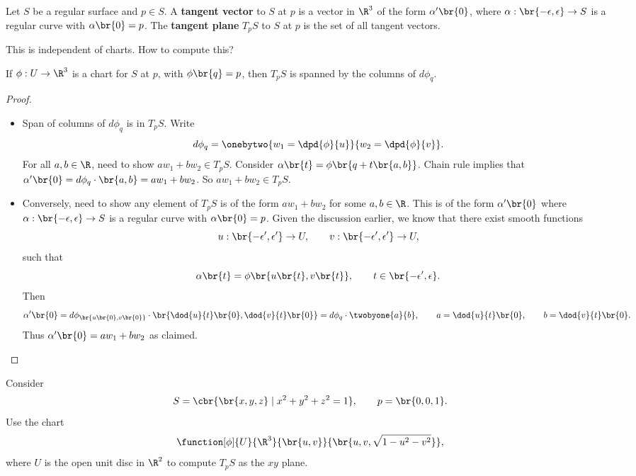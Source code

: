 \pagebreak

\begin{definition}
Let $ S $ be a regular surface and $ p \in S $. A \textbf{tangent vector} to $ S $ at $ p $ is a vector in $ \R^3 $ of the form $ \alpha'\br{0} $, where $ \alpha : \br{-\epsilon, \epsilon} \to S $ is a regular curve with $ \alpha\br{0} = p $. The \textbf{tangent plane} $ T_pS $ to $ S $ at $ p $ is the set of all tangent vectors.
\end{definition}

This is independent of charts. How to compute this?

\begin{proposition}
If $ \phi : U \to \R^3 $ is a chart for $ S $ at $ p $, with $ \phi\br{q} = p $, then $ T_pS $ is spanned by the columns of $ d\phi_q $.
\end{proposition}

\begin{proof}
\hfill
\begin{itemize}
\item Span of columns of $ d\phi_q $ is in $ T_pS $. Write
$$ d\phi_q = \onebytwo{w_1 = \dpd{\phi}{u}}{w_2 = \dpd{\phi}{v}}. $$
For all $ a, b \in \R $, need to show $ aw_1 + bw_2 \in T_pS $. Consider $ \alpha\br{t} = \phi\br{q + t\br{a, b}} $. Chain rule implies that $ \alpha'\br{0} = d\phi_q \cdot \br{a, b} = aw_1 + bw_2 $. So $ aw_1 + bw_2 \in T_pS $.
\item Conversely, need to show any element of $ T_pS $ is of the form $ aw_1 + bw_2 $ for some $ a, b \in \R $. This is of the form $ \alpha'\br{0} $ where $ \alpha : \br{-\epsilon, \epsilon} \to S $ is a regular curve with $ \alpha\br{0} = p $. Given the discussion earlier, we know that there exist smooth functions
$$ u : \br{-\epsilon', \epsilon'} \to U, \qquad v : \br{-\epsilon', \epsilon'} \to U, $$
such that
$$ \alpha\br{t} = \phi\br{u\br{t}, v\br{t}}, \qquad t \in \br{-\epsilon', \epsilon}. $$
Then
$$ \alpha'\br{0} = d\phi_{\br{u\br{0}, v\br{0}}} \cdot \br{\dod{u}{t}\br{0}, \dod{v}{t}\br{0}} = d\phi_q \cdot \twobyone{a}{b}, \qquad a = \dod{u}{t}\br{0}, \qquad b = \dod{v}{t}\br{0}. $$
Thus $ \alpha'\br{0} = aw_1 + bw_2 $ as claimed.
\end{itemize}
\end{proof}

\begin{example*}
Consider
$$ S = \cbr{\br{x, y, z} \mid x^2 + y^2 + z^2 = 1}, \qquad p = \br{0, 0, 1}. $$
Use the chart
$$ \function[\phi]{U}{\R^3}{\br{u, v}}{\br{u, v, \sqrt{1 - u^2 - v^2}}}, $$
where $ U $ is the open unit disc in $ \R^2 $ to compute $ T_pS $ as the $ xy $ plane.
\end{example*}

